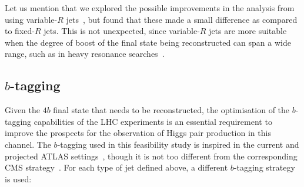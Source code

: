 Let us mention that we explored the possible improvements
in the analysis from using variable-$R$ jets~\cite{Krohn:2009zg}, but found that these made
a small difference as compared to fixed-$R$ jets.
%
This is not unexpected, since variable-$R$ jets are more suitable when
the degree of boost of the final state being reconstructed can span
a wide range, such as in heavy resonance searches~\cite{Aad:2015fna}.


\subsection{$b$-tagging}
\label{sec:btagging}

Given the $4b$ final state that needs to be reconstructed, the
optimisation of the $b$-tagging capabilities of the
LHC experiments is an essential requirement to improve
the prospects for the observation of Higgs pair production in this channel.
%
The $b$-tagging used in this feasibility study is inspired
in the current and projected ATLAS settings~\cite{Aad:2013gja},
though
it is not too different from
 the corresponding CMS strategy~\cite{Khachatryan:2011wq,Chatrchyan:2012jua}.
%
For each type of jet defined above, a different
$b$-tagging strategy is used:


